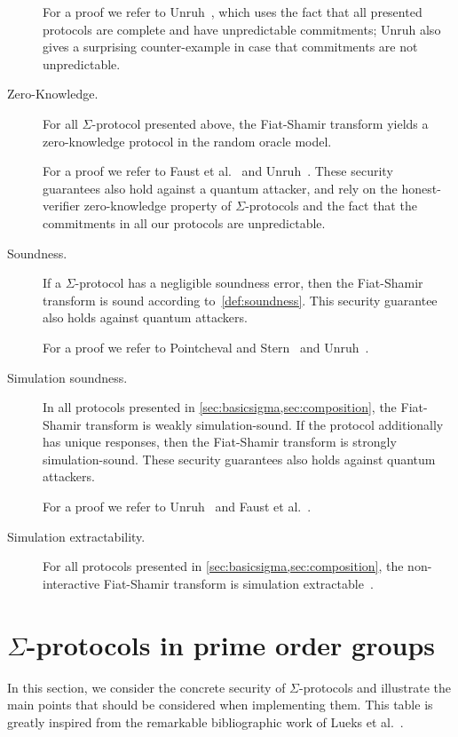 \documentclass[runningheads,11pt]{article}
\begin{document}
\begin{description}
    For a proof we refer to Unruh~\cite{AC:Unruh17}, which uses the fact that all presented protocols are complete and have unpredictable commitments;
    Unruh also gives a surprising counter-example in case that commitments are not unpredictable.
  \item[Zero-Knowledge.]
    For all $\Sigma$-protocol presented above, the Fiat-Shamir transform yields a zero-knowledge protocol in the random oracle model.

    For a proof we refer to Faust et al.~\cite{INDOCRYPT:FKMV12} and Unruh~\cite{AC:Unruh17}. These security guarantees also hold against a quantum attacker, and rely on the honest-verifier zero-knowledge property of $\Sigma$-protocols and the fact that the commitments in all our protocols are unpredictable.
  \item[Soundness.]
    If a $\Sigma$-protocol has a negligible soundness error, then the Fiat-Shamir transform is sound according to~\cref{def:soundness}.
    This security guarantee also holds against quantum attackers.

    For a proof we refer to Pointcheval and Stern~\cite{JC:PoiSte00} and Unruh~\cite{AC:Unruh17}.


  \item[Simulation soundness.]
    In all protocols presented in \cref{sec:basicsigma,sec:composition}, the Fiat-Shamir transform is  weakly simulation-sound.
    If the protocol additionally has unique responses, then the Fiat-Shamir transform is  strongly simulation-sound.
    These security guarantees also holds against quantum attackers.

    For a proof we refer to Unruh~\cite{AC:Unruh17} and Faust et al.~\cite{INDOCRYPT:FKMV12}.
  \item[Simulation extractability.]
    For all protocols presented in \cref{sec:basicsigma,sec:composition}, the non-interactive Fiat-Shamir transform is simulation %
    extractable~\cite[Thm. 1]{AC:BerPerWar12}.
\end{description}

\section{$\Sigma$-protocols in prime order groups}
\label{sec:instantiation}

In this section, we consider the concrete security of $\Sigma$-protocols and illustrate the main points that should be considered when implementing them.
This table is greatly inspired from the remarkable bibliographic work of Lueks et al.~\cite{zksk}.
\end{document}
